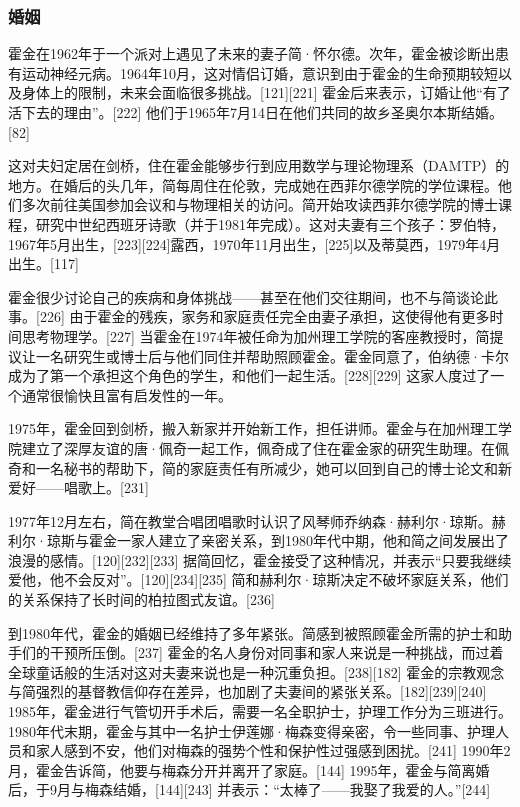 \subsubsection{婚姻}
霍金在1962年于一个派对上遇见了未来的妻子简·怀尔德。次年，霍金被诊断出患有运动神经元病。1964年10月，这对情侣订婚，意识到由于霍金的生命预期较短以及身体上的限制，未来会面临很多挑战。[121][221] 霍金后来表示，订婚让他“有了活下去的理由”。[222] 他们于1965年7月14日在他们共同的故乡圣奥尔本斯结婚。[82]

这对夫妇定居在剑桥，住在霍金能够步行到应用数学与理论物理系（DAMTP）的地方。在婚后的头几年，简每周住在伦敦，完成她在西菲尔德学院的学位课程。他们多次前往美国参加会议和与物理相关的访问。简开始攻读西菲尔德学院的博士课程，研究中世纪西班牙诗歌（并于1981年完成）。这对夫妻有三个孩子：罗伯特，1967年5月出生，[223][224]露西，1970年11月出生，[225]以及蒂莫西，1979年4月出生。[117]

霍金很少讨论自己的疾病和身体挑战——甚至在他们交往期间，也不与简谈论此事。[226] 由于霍金的残疾，家务和家庭责任完全由妻子承担，这使得他有更多时间思考物理学。[227] 当霍金在1974年被任命为加州理工学院的客座教授时，简提议让一名研究生或博士后与他们同住并帮助照顾霍金。霍金同意了，伯纳德·卡尔成为了第一个承担这个角色的学生，和他们一起生活。[228][229] 这家人度过了一个通常很愉快且富有启发性的一年。

1975年，霍金回到剑桥，搬入新家并开始新工作，担任讲师。霍金与在加州理工学院建立了深厚友谊的唐·佩奇一起工作，佩奇成了住在霍金家的研究生助理。在佩奇和一名秘书的帮助下，简的家庭责任有所减少，她可以回到自己的博士论文和新爱好——唱歌上。[231]

1977年12月左右，简在教堂合唱团唱歌时认识了风琴师乔纳森·赫利尔·琼斯。赫利尔·琼斯与霍金一家人建立了亲密关系，到1980年代中期，他和简之间发展出了浪漫的感情。[120][232][233] 据简回忆，霍金接受了这种情况，并表示“只要我继续爱他，他不会反对”。[120][234][235] 简和赫利尔·琼斯决定不破坏家庭关系，他们的关系保持了长时间的柏拉图式友谊。[236]

到1980年代，霍金的婚姻已经维持了多年紧张。简感到被照顾霍金所需的护士和助手们的干预所压倒。[237] 霍金的名人身份对同事和家人来说是一种挑战，而过着全球童话般的生活对这对夫妻来说也是一种沉重负担。[238][182] 霍金的宗教观念与简强烈的基督教信仰存在差异，也加剧了夫妻间的紧张关系。[182][239][240] 1985年，霍金进行气管切开手术后，需要一名全职护士，护理工作分为三班进行。1980年代末期，霍金与其中一名护士伊莲娜·梅森变得亲密，令一些同事、护理人员和家人感到不安，他们对梅森的强势个性和保护性过强感到困扰。[241] 1990年2月，霍金告诉简，他要与梅森分开并离开了家庭。[144] 1995年，霍金与简离婚后，于9月与梅森结婚，[144][243] 并表示：“太棒了——我娶了我爱的人。”[244]

